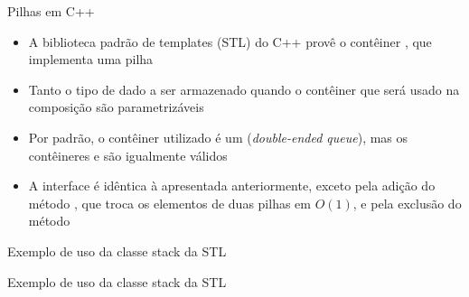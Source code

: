 \begin{frame}[fragile]{Pilhas em C++}

    \begin{itemize}
        \item A biblioteca padrão de templates (STL) do C++ provê o contêiner ,
            que implementa uma pilha

        \item Tanto o tipo de dado a ser armazenado quando o contêiner que será usado na composição
            são parametrizáveis

        \item Por padrão, o contêiner utilizado é um  (\textit{double-ended queue}),
            mas os contêineres  e  são igualmente válidos

        \item A interface é idêntica à apresentada anteriormente, exceto pela adição do método
            , que troca os elementos de duas pilhas em $O(1)$, e pela exclusão
            do método 

    \end{itemize}

\end{frame}

\begin{frame}[fragile]{Exemplo de uso da classe stack da STL}
\end{frame}

\begin{frame}[fragile]{Exemplo de uso da classe stack da STL}
\end{frame}
